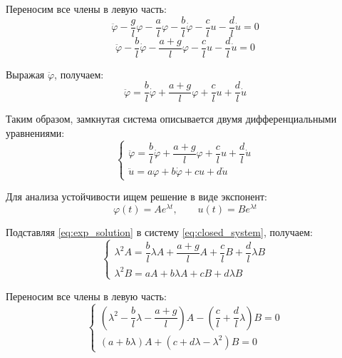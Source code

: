 \documentclass[a4paper, 12pt]{article}
\begin{document}
Переносим все члены в левую часть:
\begin{equation}
\ddot{\varphi} - \frac{g}{l}\varphi - \frac{a}{l}\varphi - \frac{b}{l}\dot{\varphi} - \frac{c}{l}u - \frac{d}{l}\dot{u} = 0
\end{equation}
\begin{equation}
\ddot{\varphi} - \frac{b}{l}\dot{\varphi} - \frac{a+g}{l}\varphi - \frac{c}{l}u - \frac{d}{l}\dot{u} = 0
\end{equation}

Выражая \(\ddot{\varphi}\), получаем:
\begin{equation}
\ddot{\varphi} = \frac{b}{l}\dot{\varphi} + \frac{a+g}{l}\varphi + \frac{c}{l}u + \frac{d}{l}\dot{u}
\end{equation}

Таким образом, замкнутая система описывается двумя дифференциальными уравнениями:
\begin{equation}
\boxed{
\begin{cases}
\ddot{\varphi} = \dfrac{b}{l}\dot{\varphi} + \dfrac{a+g}{l}\varphi + \dfrac{c}{l}u + \dfrac{d}{l}\dot{u} \\[10pt]
\ddot{u} = a\varphi + b\dot{\varphi} + cu + d\dot{u}
\end{cases}
}
\label{eq:closed_system}
\end{equation}

Для анализа устойчивости ищем решение в виде экспонент:
\begin{equation}
\varphi(t) = A e^{\lambda t}, \qquad u(t) = B e^{\lambda t}
\label{eq:exp_solution}
\end{equation}

Подставляя \eqref{eq:exp_solution} в систему \eqref{eq:closed_system}, получаем:
\begin{equation}
\begin{cases}
\lambda^2 A = \dfrac{b}{l}\lambda A + \dfrac{a+g}{l} A + \dfrac{c}{l} B + \dfrac{d}{l}\lambda B \\[10pt]
\lambda^2 B = a A + b\lambda A + c B + d\lambda B
\end{cases}
\end{equation}

Переносим все члены в левую часть:
\begin{equation}
\begin{cases}
\left(\lambda^2 - \dfrac{b}{l}\lambda - \dfrac{a+g}{l}\right) A - \left(\dfrac{c}{l} + \dfrac{d}{l}\lambda\right) B = 0 \\[10pt]
(a + b\lambda) A + \left(c + d\lambda - \lambda^2\right) B = 0
\end{cases}
\label{eq:algebraic}
\end{equation}
\end{document}
